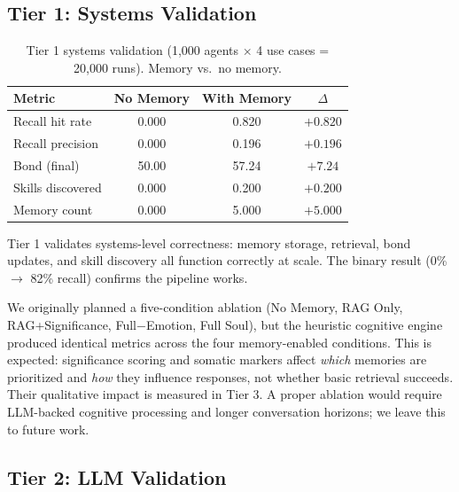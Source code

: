 \documentclass{article}
\begin{document}
\subsection{Tier 1: Systems Validation}

\begin{table}[h]
\centering
\small
\begin{tabular}{@{}lccc@{}}
\toprule
\textbf{Metric} & \textbf{No Memory} & \textbf{With Memory} & \textbf{$\Delta$} \\
\midrule
Recall hit rate   & 0.000 & 0.820 & $+0.820$ \\
Recall precision  & 0.000 & 0.196 & $+0.196$ \\
Bond (final)      & 50.00 & 57.24 & $+7.24$ \\
Skills discovered & 0.000 & 0.200 & $+0.200$ \\
Memory count      & 0.000 & 5.000 & $+5.000$ \\
\bottomrule
\end{tabular}
\caption{Tier 1 systems validation (1,000 agents $\times$ 4 use cases = 20,000 runs). Memory vs.\ no memory.}
\label{tab:tier1}
\end{table}

Tier 1 validates systems-level correctness: memory storage, retrieval, bond updates, and skill discovery all function correctly at scale. The binary result (0\% $\rightarrow$ 82\% recall) confirms the pipeline works.

We originally planned a five-condition ablation (No Memory, RAG Only, RAG+Significance, Full$-$Emotion, Full Soul), but the heuristic cognitive engine produced identical metrics across the four memory-enabled conditions. This is expected: significance scoring and somatic markers affect \textit{which} memories are prioritized and \textit{how} they influence responses, not whether basic retrieval succeeds. Their qualitative impact is measured in Tier 3. A proper ablation would require LLM-backed cognitive processing and longer conversation horizons; we leave this to future work.

\subsection{Tier 2: LLM Validation}
\end{document}
